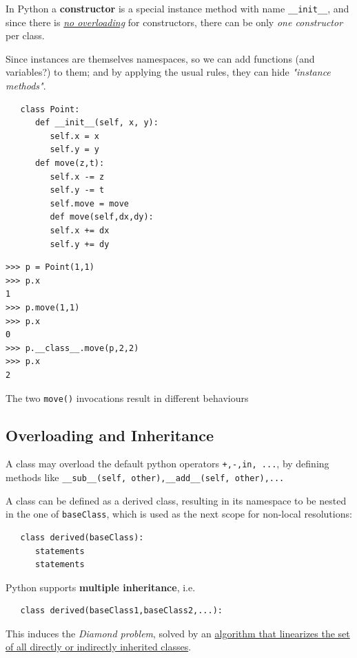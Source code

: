 In Python a \textbf{constructor} is a special instance method with name \lstinline|__init__|, and since there is \textit{\underline{no overloading}} for constructors, there can be only \textit{one constructor} per class.

Since instances are themselves namespaces, so we can add functions (and variables?) to them; and by applying the usual rules, they can hide \textit{"instance methods"}.

\begin{paracol}{2}
   
\begin{lstlisting}
   class Point:
      def __init__(self, x, y):
         self.x = x
         self.y = y
      def move(z,t):
         self.x -= z
         self.y -= t
         self.move = move
         def move(self,dx,dy):
         self.x += dx
         self.y += dy
\end{lstlisting}
\switchcolumn
\begin{lstlisting}
>>> p = Point(1,1)
>>> p.x
1
>>> p.move(1,1)
>>> p.x
0
>>> p.__class__.move(p,2,2)
>>> p.x
2
\end{lstlisting}
The two \lstinline|move()| invocations result in different behaviours
\end{paracol}

\subsection{Overloading and Inheritance}
A class may overload the default python operators \lstinline|+,-,in, ...|,
by defining methods like \lstinline|__sub__(self, other),__add__(self, other),...|


A class can be defined as a derived class, resulting in its namespace to be nested in the one of \lstinline|baseClass|, which is used as the next scope for non-local resolutions:  
\begin{lstlisting}
   class derived(baseClass):
      statements
      statements
\end{lstlisting}
Python supports \textbf{multiple inheritance}, i.e.
\begin{lstlisting}
   class derived(baseClass1,baseClass2,...):
\end{lstlisting}
This induces the \textit{Diamond problem}, solved by an \href{https://www.python.org/download/releases/2.3/mro/}{algorithm that linearizes the set of all directly or indirectly inherited classes}.

